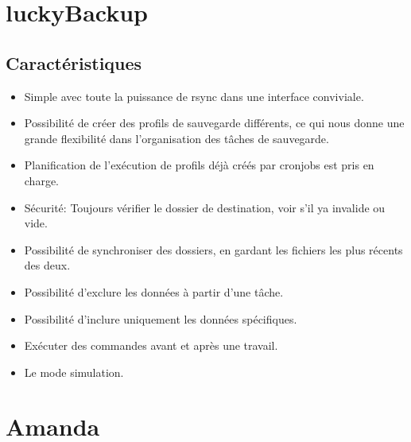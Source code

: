 \documentclass[a4paper,11pt]{report}
\begin{document}
\section{luckyBackup}
\subsection{Caractéristiques}
\begin{itemize}
  \item Simple avec toute la puissance de rsync dans une interface conviviale.
  \item Possibilité de créer des profils de sauvegarde différents, ce qui nous donne une grande flexibilité dans l'organisation des tâches de sauvegarde.
  \item Planification de l'exécution de profils déjà créés par cronjobs est pris en charge.
  \item Sécurité: Toujours vérifier le dossier de destination, voir s'il ya invalide ou vide.
  \item Possibilité de synchroniser des dossiers, en gardant les fichiers les plus récents des deux.
  \item Possibilité d'exclure les données à partir d'une tâche.
  \item Possibilité d'inclure uniquement les données spécifiques.
  \item Exécuter des commandes avant et après une travail.
  \item Le mode simulation.
\end{itemize}




\section{Amanda}
\end{document}
